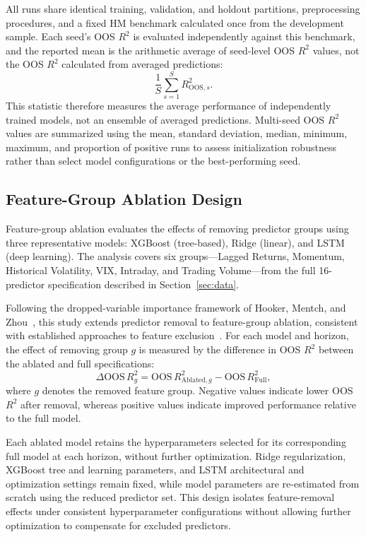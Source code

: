 \documentclass[runningheads,orivec]{llncs}
\begin{document}
All runs share identical training, validation, and holdout partitions, preprocessing procedures, and a fixed HM benchmark calculated once from the development sample. Each seed's OOS $R^2$ is evaluated independently against this benchmark, and the reported mean is the arithmetic average of seed-level OOS $R^2$ values, not the OOS $R^2$ calculated from averaged predictions:
\[
\frac{1}{S}\sum_{s=1}^{S} R^2_{\mathrm{OOS},s}.
\]
This statistic therefore measures the average performance of independently trained models, not an ensemble of averaged predictions. Multi-seed OOS $R^2$ values are summarized using the mean, standard deviation, median, minimum, maximum, and proportion of positive runs to assess initialization robustness rather than select model configurations or the best-performing seed.

\subsection{Feature-Group Ablation Design}\label{subsec:ablation_design}

Feature-group ablation evaluates the effects of removing predictor groups using three representative models: XGBoost (tree-based), Ridge (linear), and LSTM (deep learning). The analysis covers six groups---Lagged Returns, Momentum, Historical Volatility, VIX, Intraday, and Trading Volume---from the full 16-predictor specification described in Section~\ref{sec:data}.

Following the dropped-variable importance framework of Hooker, Mentch, and Zhou~\cite{hooker2021}, this study extends predictor removal to feature-group ablation, consistent with established approaches to feature exclusion~\cite{sheikholeslami2021}. For each model and horizon, the effect of removing group $g$ is measured by the difference in OOS $R^2$ between the ablated and full specifications:
\begin{equation}\label{eq:delta_oos_r2}
\Delta \mathrm{OOS}\,R^2_g = \mathrm{OOS}\,R^2_{\text{Ablated},g} - \mathrm{OOS}\,R^2_{\text{Full}},
\end{equation}
where $g$ denotes the removed feature group. Negative values indicate lower OOS $R^2$ after removal, whereas positive values indicate improved performance relative to the full model.

Each ablated model retains the hyperparameters selected for its corresponding full model at each horizon, without further optimization. Ridge regularization, XGBoost tree and learning parameters, and LSTM architectural and optimization settings remain fixed, while model parameters are re-estimated from scratch using the reduced predictor set. This design isolates feature-removal effects under consistent hyperparameter configurations without allowing further optimization to compensate for excluded predictors.
\end{document}
